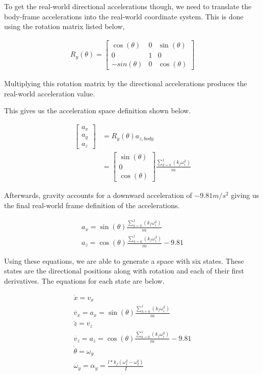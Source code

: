     To get the real-world directional accelerations though, we need to translate
    the body-frame accelerations into the real-world coordinate system.
    This is done using the rotation matrix listed below,

    \begin{align}
        R_y(\theta) = \begin{bmatrix} \cos(\theta) & 0 & \sin(\theta) \\ 0 & 1 & 0 \\
            -sin(\theta) & 0 & \cos(\theta) \end{bmatrix}
    \end{align}

    Multiplying this rotation matrix by the directional accelerations produces the real-world
    acceleration value.

    This gives us the acceleration space definition shown below.

    \begin{align}
        \begin{bmatrix} a_x \\ a_y \\ a_z \end{bmatrix} &= R_y(\theta) a_{z, body}\\
        &= \begin{bmatrix} \sin(\theta) \\ 0 \\ \cos(\theta) \end{bmatrix} \frac{\sum_{k=0}^1(k_f\omega_i^2)}{m}
    \end{align}

    Afterwards, gravity accounts for a downward acceleration of $-9.81 m/s^2$ giving us the final real-world
    frame definition of the accelerations.

    \begin{align}
        a_x = \sin(\theta) \frac{\sum_{k=0}^1(k_f\omega_i^2)}{m}\\
        a_z = \cos(\theta) \frac{\sum_{k=0}^1(k_f\omega_i^2)}{m} - 9.81
    \end{align}

    Using these equations, we are able to generate a space with six states.
    These states are the directional positions along with rotation and each
    of their first derivatives.
    The equations for each state are below.

    \begin{align}
        \dot{x} = v_x\\
        \dot{v_x} = a_x = \sin(\theta) \frac{\sum_{k=0}^1(k_f\omega_i^2)}{m}\\
        \dot{z} = v_z\\
        \dot{v_z} = a_z = \cos(\theta) \frac{\sum_{k=0}^1(k_f\omega_i^2)}{m} - 9.81\\
        \dot{\theta} = \omega_y\\
        \dot{\omega_y} = \alpha_y = \frac{l*k_f(\omega_1^2 - \omega_2^2)}{I}
    \end{align}

